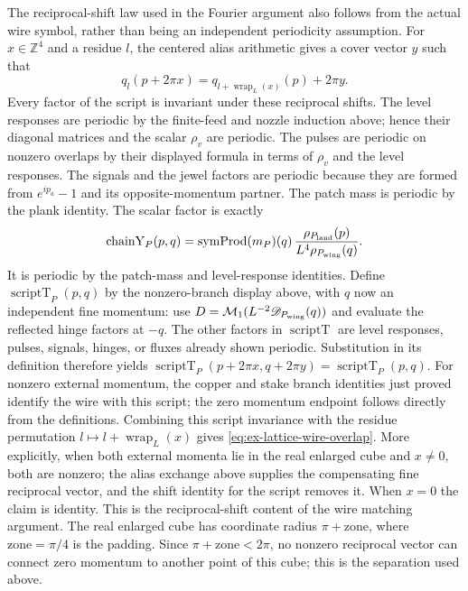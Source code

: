 The reciprocal-shift law used in the Fourier argument also follows from
the actual wire symbol, rather than being an independent periodicity
assumption. For $x\in\mathbb Z^4$ and a residue $l$, the centered alias
arithmetic gives a cover vector $y$ such that
\[
 q_l(p+2\pi x)=q_{l+\operatorname{wrap}_L(x)}(p)+2\pi y.
\]
Every factor of the script is invariant under these reciprocal shifts.
The level responses are periodic by the finite-feed and nozzle induction
above; hence their diagonal matrices and the scalar $\rho_v$ are periodic.
The pulses are periodic on nonzero overlaps by their displayed formula in
terms of $\rho_v$ and the level responses. The signals and the jewel factors are periodic because they are
formed from $e^{ip_a}-1$ and its opposite-momentum partner. The patch mass is
periodic by the plank identity. The scalar factor is exactly
\[
 \operatorname{chainY}_P(p,q)=
 \operatorname{symProd}(m_P)(q)\,
 \frac{\rho_{P_{\rm land}}(p)}{L^4\rho_{P_{\rm wing}}(q)}.
\]
It is periodic by the patch-mass and level-response identities. Define
$\operatorname{scriptT}_P(p,q)$ by the nonzero-branch display above, with
$q$ now an independent fine momentum: use
$D=\mathcal M_1(L^{-2}\mathscr D_{P_{\rm wing}}(q))$ and evaluate the
reflected hinge factors at $-q$. The other
factors in $\operatorname{scriptT}$ are level responses, pulses, signals,
hinges, or fluxes already shown periodic. Substitution in its definition
therefore yields
$\operatorname{scriptT}_P(p+2\pi x,q+2\pi y)=
\operatorname{scriptT}_P(p,q)$. For nonzero external momentum, the copper and
stake branch identities just proved identify the wire with this script;
the zero momentum endpoint follows directly from the definitions. Combining
this script invariance with the residue permutation
$l\mapsto l+\operatorname{wrap}_L(x)$ gives
\eqref{eq:ex-lattice-wire-overlap}. More explicitly, when both external
momenta lie in the real enlarged cube and $x\ne0$, both are nonzero; the
alias exchange above supplies the compensating fine reciprocal vector, and
the shift identity for the script removes it. When $x=0$ the claim is
identity. This is the reciprocal-shift content of the wire matching
argument.
The real enlarged cube has coordinate radius $\pi+\mathrm{zone}$, where
$\mathrm{zone}=\pi/4$ is the padding. Since $\pi+\mathrm{zone}<2\pi$,
no nonzero reciprocal vector can connect zero momentum to another point
of this cube; this is the separation used above.

